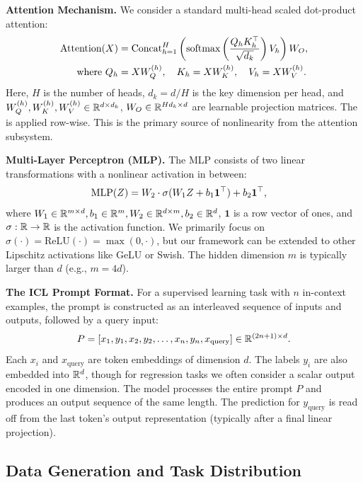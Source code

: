 \noindent \textbf{Attention Mechanism.} We consider a standard multi-head scaled dot-product attention:
\begin{align}
	\text{Attention}(X) &= \text{Concat}_{h=1}^{H}\left(\text{softmax}\left(\frac{Q_h K_h^{\top}}{\sqrt{d_k}}\right)V_h\right)W_O, \\
	\text{where } Q_h &= X W_Q^{(h)}, \quad K_h = X W_K^{(h)}, \quad V_h = X W_V^{(h)}.
\end{align}
Here, \( H \) is the number of heads, \( d_k = d/H \) is the key dimension per head, and \( W_Q^{(h)}, W_K^{(h)}, W_V^{(h)} \in \mathbb{R}^{d \times d_k} \), \( W_O \in \mathbb{R}^{H d_k \times d} \) are learnable projection matrices. The  is applied row-wise. This is the primary source of nonlinearity from the attention subsystem.

\noindent \textbf{Multi-Layer Perceptron (MLP).} The MLP consists of two linear transformations with a nonlinear activation in between:
\begin{align}
	\text{MLP}(Z) &= W_2 \cdot \sigma(W_1 Z + b_1 \mathbf{1}^{\top}) + b_2 \mathbf{1}^{\top},
\end{align}
where \( W_1 \in \mathbb{R}^{m \times d}, b_1 \in \mathbb{R}^{m}, W_2 \in \mathbb{R}^{d \times m}, b_2 \in \mathbb{R}^{d} \), \( \mathbf{1} \) is a row vector of ones, and \( \sigma: \mathbb{R} \to \mathbb{R} \) is the activation function. We primarily focus on \( \sigma(\cdot) = \text{ReLU}(\cdot) = \max(0, \cdot) \), but our framework can be extended to other Lipschitz activations like GeLU or Swish. The hidden dimension \( m \) is typically larger than \( d \) (e.g., \( m = 4d \)).

\textbf{The ICL Prompt Format.} For a supervised learning task with \( n \) in-context examples, the prompt is constructed as an interleaved sequence of inputs and outputs, followed by a query input:
\begin{equation}
	P = [x_1, y_1, x_2, y_2, \dots, x_n, y_n, x_{\text{query}}] \in \mathbb{R}^{(2n+1) \times d}.
	\label{eq:prompt_format}
\end{equation}
Each \( x_i \) and \( x_{\text{query}} \) are token embeddings of dimension \( d \). The labels \( y_i \) are also embedded into \( \mathbb{R}^d \), though for regression tasks we often consider a scalar output encoded in one dimension. The model processes the entire prompt \( P \) and produces an output sequence of the same length. The prediction for \( y_{\text{query}} \) is read off from the last token's output representation (typically after a final linear projection).

\subsection{Data Generation and Task Distribution}
\label{subsec:data_model}

